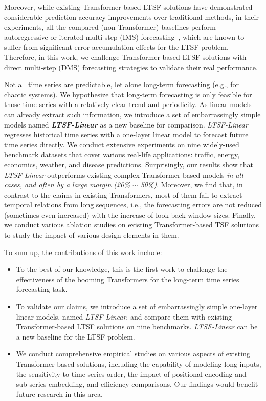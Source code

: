 \documentclass[10pt,twocolumn,letterpaper]{article}
\newcommand{\modelname}{\emph{LTSF-Linear}\xspace}
\begin{document}
Moreover, while existing Transformer-based LTSF solutions have demonstrated considerable prediction accuracy improvements over traditional methods, 
in their experiments, all the compared (non-Transformer) baselines perform autoregressive or iterated multi-step (IMS) forecasting~\cite{ariyo2014arima,DavidSalinas2017DeepARPF,DzmitryBahdanau2014NeuralMT,SeanJTaylor2017ForecastingAS}, which are known to suffer from significant error accumulation effects for the LTSF problem. Therefore, in this work, we challenge Transformer-based LTSF solutions with direct multi-step (DMS) forecasting strategies to validate their real performance.  

Not all time series are predictable, let alone long-term forecasting (e.g., for chaotic systems). We hypothesize that long-term forecasting is only feasible for those time series with a relatively clear trend and periodicity. As linear models can already extract such information, we introduce a set of embarrassingly simple models named \textbf{\modelname} as a new baseline for comparison. 
\modelname regresses historical time series with a one-layer linear model to forecast future time series directly. We conduct extensive experiments on nine widely-used benchmark datasets that cover various real-life applications: traffic, energy, economics, weather, and disease predictions.
Surprisingly, our results show that \modelname outperforms existing complex Transformer-based models \emph{in all cases, and often by a large margin (20\% $\sim$ 50\%)}. 
Moreover, we find that, in contrast to the claims in existing Transformers, most of them fail to extract temporal relations from long sequences, i.e., the forecasting errors are not reduced (sometimes even increased) with the increase of look-back window sizes. Finally, we conduct various ablation studies on existing Transformer-based TSF solutions to study the impact of various design elements in them. 

To sum up, the contributions of this work include:

\begin{itemize}

\item To the best of our knowledge, this is the first work to challenge the effectiveness of the booming Transformers for the long-term time series forecasting task. 

\item To validate our claims, we introduce a set of embarrassingly simple one-layer linear models, named \modelname, and compare them with existing Transformer-based LTSF solutions on nine benchmarks. \modelname can be a new baseline for the LTSF problem.

\item We conduct comprehensive empirical studies on various aspects of existing Transformer-based solutions, including the capability of modeling long inputs, the sensitivity to time series order, the impact of positional encoding and sub-series embedding, and efficiency comparisons. Our findings would benefit future research in this area. 


\end{itemize}
\end{document}
